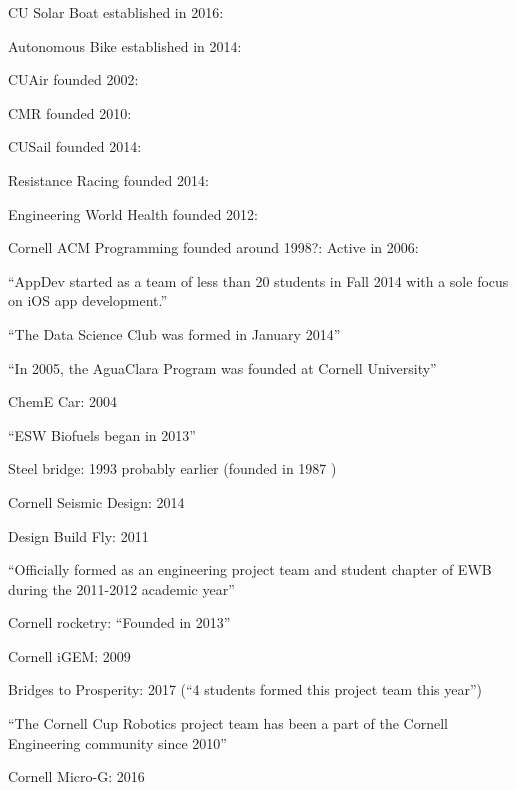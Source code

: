 \documentclass[12pt]{article}
\begin{document}
CU Solar Boat established in 2016:
\cite{noauthor_cu_2017}

Autonomous Bike established in 2014:
\cite{murphy_cu_2017}

CUAir founded 2002:
\cite{noauthor_cuair_2017}

CMR founded 2010:
\cite{noauthor_cornell_2018}

CUSail founded 2014:
\cite{noauthor_cu_2017-1}

Resistance Racing founded 2014:
\cite{noauthor_about_2015}

Engineering World Health founded 2012:
\cite{noauthor_cornell_2017-1}

Cornell ACM Programming founded around 1998?:
\cite{noauthor_cornell_2016}
Active in 2006:
\cite{noauthor_cornell_2018-1}

``AppDev started as a team of less than 20 students in Fall 2014 with a sole focus on iOS app development.''
\cite{cornell_appdev_introducing_2018}

``The Data Science Club was formed in January 2014''
\cite{noauthor_cornell_2014}

``In 2005, the AguaClara Program was founded at Cornell University''
\cite{noauthor_aguaclara_2017}

ChemE Car: 2004
\cite{noauthor_cornell_2017-2}

``ESW Biofuels began in 2013''
\cite{noauthor_esw_2017}

Steel bridge: 1993
\cite{noauthor_cee_2011}
probably earlier (founded in 1987 \cite{robert_e._shaw_jr._bridging_1988})

Cornell Seismic Design: 2014
\cite{noauthor_2014_2014}

Design Build Fly: 2011
\cite{noauthor_design/build/fly_2017}

``Officially formed as an engineering project team and student chapter of EWB during the 2011-2012 academic year''
\cite{noauthor_our_2016}

Cornell rocketry: ``Founded in 2013''
\cite{noauthor_cornell_2015}

Cornell iGEM: 2009
\cite{noauthor_team:cornell/team_2009}

Bridges to Prosperity: 2017 (``4 students formed this project team this year'')
\cite{noauthor_give_2018}

``The Cornell Cup Robotics project team has been a part of the Cornell Engineering community since 2010''
\cite{noauthor_cornell_2018-2}

Cornell Micro-G: 2016
\cite{ghosh_student_2016}
\end{document}
